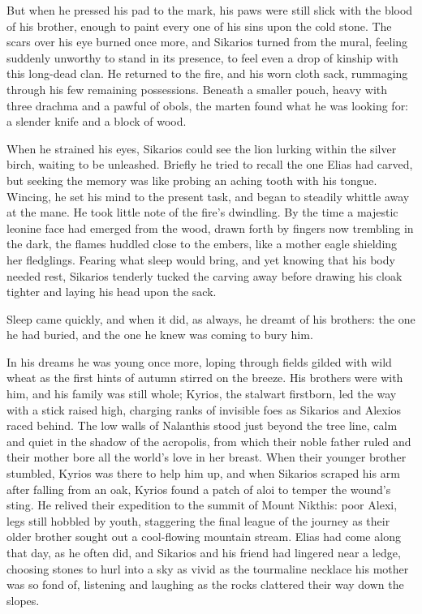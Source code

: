 But when he pressed his pad to the mark, his paws were still slick with the blood of his brother, enough to paint every one of his sins upon the cold stone. The scars over his eye burned once more, and Sikarios turned from the mural, feeling suddenly unworthy to stand in its presence, to feel even a drop of kinship with this long-dead clan. He returned to the fire, and his worn cloth sack, rummaging through his few remaining possessions. Beneath a smaller pouch, heavy with three drachma and a pawful of obols, the marten found what he was looking for: a slender knife and a block of wood.

When he strained his eyes, Sikarios could see the lion lurking within the silver birch, waiting to be unleashed. Briefly he tried to recall the one Elias had carved, but seeking the memory was like probing an aching tooth with his tongue. Wincing, he set his mind to the present task, and began to steadily whittle away at the mane. He took little note of the fire's dwindling. By the time a majestic leonine face had emerged from the wood, drawn forth by fingers now trembling in the dark, the flames huddled close to the embers, like a mother eagle shielding her fledglings. Fearing what sleep would bring, and yet knowing that his body needed rest, Sikarios tenderly tucked the carving away before drawing his cloak tighter and laying his head upon the sack.

Sleep came quickly, and when it did, as always, he dreamt of his brothers: the one he had buried, and the one he knew was coming to bury him.

\secdiv

\noindent In his dreams he was young once more, loping through fields gilded with wild wheat as the first hints of autumn stirred on the breeze. His brothers were with him, and his family was still whole; Kyrios, the stalwart firstborn, led the way with a stick raised high, charging ranks of invisible foes as Sikarios and Alexios raced behind. The low walls of Nalanthis stood just beyond the tree line, calm and quiet in the shadow of the acropolis, from which their noble father ruled and their mother bore all the world's love in her breast. When their younger brother stumbled, Kyrios was there to help him up, and when Sikarios scraped his arm after falling from an oak, Kyrios found a patch of aloi to temper the wound's sting. He relived their expedition to the summit of Mount Nikthis: poor Alexi, legs still hobbled by youth, staggering the final league of the journey as their older brother sought out a cool-flowing mountain stream. Elias had come along that day, as he often did, and Sikarios and his friend had lingered near a ledge, choosing stones to hurl into a sky as vivid as the tourmaline necklace his mother was so fond of, listening and laughing as the rocks clattered their way down the slopes.

